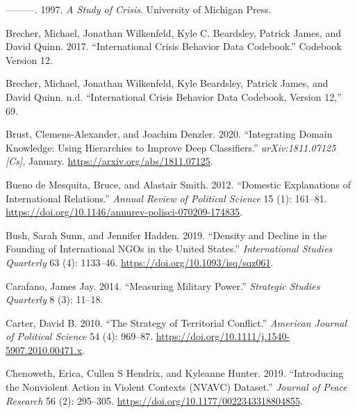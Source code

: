 \documentclass{article}
\newlength{\cslhangindent}
\newlength{\cslentryspacingunit} %
\newenvironment{CSLReferences}[2] %
 {%
  \setlength{\parindent}{0pt}
  \ifodd #1
  \let\oldpar\par
  \def\par{\hangindent=\cslhangindent\oldpar}
  \fi
  \setlength{\parskip}{#2\cslentryspacingunit}
 }%
 {}
\begin{document}
\begin{CSLReferences}{1}{0}
\leavevmode{}%
---------. 1997. \emph{A {Study} of {Crisis}}. {University of Michigan
Press}.

\leavevmode{}%
Brecher, Michael, Jonathan Wilkenfeld, Kyle C. Beardsley, Patrick James,
and David Quinn. 2017. {``International {Crisis Behavior Data
Codebook}.''} Codebook Version 12.

\leavevmode{}%
Brecher, Michael, Jonathan Wilkenfeld, Kyle Beardsley, Patrick James,
and David Quinn. n.d. {``International {Crisis Behavior Data Codebook},
{Version} 12,''} 69.

\leavevmode{}%
Brust, Clemens-Alexander, and Joachim Denzler. 2020. {``Integrating
Domain Knowledge: Using Hierarchies to Improve Deep Classifiers.''}
\emph{arXiv:1811.07125 {[}Cs{]}}, January.
\url{https://arxiv.org/abs/1811.07125}.

\leavevmode{}%
Bueno de Mesquita, Bruce, and Alastair Smith. 2012. {``Domestic
{Explanations} of {International Relations}.''} \emph{Annual Review of
Political Science} 15 (1): 161--81.
\url{https://doi.org/10.1146/annurev-polisci-070209-174835}.

\leavevmode{}%
Bush, Sarah Sunn, and Jennifer Hadden. 2019. {``Density and {Decline} in
the {Founding} of {International NGOs} in the {United States}.''}
\emph{International Studies Quarterly} 63 (4): 1133--46.
\url{https://doi.org/10.1093/isq/sqz061}.

\leavevmode{}%
Carafano, James Jay. 2014. {``Measuring {Military Power}.''}
\emph{Strategic Studies Quarterly} 8 (3): 11--18.

\leavevmode{}%
Carter, David B. 2010. {``The {Strategy} of {Territorial Conflict}.''}
\emph{American Journal of Political Science} 54 (4): 969--87.
\url{https://doi.org/10.1111/j.1540-5907.2010.00471.x}.

\leavevmode{}%
Chenoweth, Erica, Cullen S Hendrix, and Kyleanne Hunter. 2019.
{``Introducing the {Nonviolent Action} in {Violent Contexts} ({NVAVC})
Dataset.''} \emph{Journal of Peace Research} 56 (2): 295--305.
\url{https://doi.org/10.1177/0022343318804855}.


\end{CSLReferences}
\end{document}
